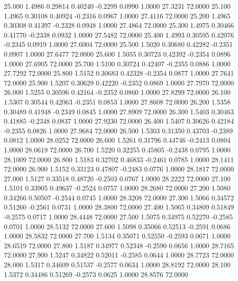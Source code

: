   25.000   1.4986   0.29814   0.40240  -0.2299   0.0990   1.0000  27.3231  72.0000
  25.100   1.4965   0.30108   0.40924  -0.2316   0.0967   1.0000  27.4116  72.0000
  25.200   1.4965   0.30308   0.41397  -0.2328   0.0948   1.0000  27.4864  72.0000
  25.300   1.4975   0.30466   0.41770  -0.2338   0.0932   1.0000  27.5482  72.0000
  25.400   1.4993   0.30595   0.42076  -0.2345   0.0919   1.0000  27.6004  72.0000
  25.500   1.5020   0.30680   0.42282  -0.2351   0.0907   1.0000  27.6477  72.0000
  25.600   1.5055   0.30723   0.42392  -0.2354   0.0896   1.0000  27.6905  72.0000
  25.700   1.5100   0.30724   0.42407  -0.2355   0.0886   1.0000  27.7292  72.0000
  25.800   1.5152   0.30683   0.42328  -0.2354   0.0877   1.0000  27.7641  72.0000
  25.900   1.5207   0.30629   0.42220  -0.2352   0.0869   1.0000  27.7970  72.0000
  26.000   1.5255   0.30596   0.42164  -0.2352   0.0860   1.0000  27.8299  72.0000
  26.100   1.5307   0.30544   0.42063  -0.2351   0.0853   1.0000  27.8608  72.0000
  26.200   1.5358   0.30489   0.41948  -0.2349   0.0845   1.0000  27.8909  72.0000
  26.300   1.5403   0.30463   0.41885  -0.2348   0.0837   1.0000  27.9230  72.0000
  26.400   1.5407   0.30626   0.42184  -0.2355   0.0826   1.0000  27.9684  72.0000
  26.500   1.5303   0.31350   0.43703  -0.2389   0.0812   1.0000  28.0252  72.0000
  26.600   1.5261   0.31796   0.44746  -0.2413   0.0804   1.0000  28.0619  72.0000
  26.700   1.5220   0.32255   0.45805  -0.2438   0.0795   1.0000  28.1009  72.0000
  26.800   1.5183   0.32702   0.46833  -0.2461   0.0785   1.0000  28.1411  72.0000
  26.900   1.5152   0.33123   0.47807  -0.2483   0.0776   1.0000  28.1817  72.0000
  27.000   1.5127   0.33518   0.48720  -0.2503   0.0767   1.0000  28.2222  72.0000
  27.100   1.5101   0.33905   0.49637  -0.2524   0.0757   1.0000  28.2680  72.0000
  27.200   1.5080   0.34266   0.50507  -0.2544   0.0745   1.0000  28.3208  72.0000
  27.300   1.5066   0.34572   0.51260  -0.2561   0.0731   1.0000  28.3800  72.0000
  27.400   1.5065   0.34809   0.51849  -0.2575   0.0717   1.0000  28.4448  72.0000
  27.500   1.5075   0.34975   0.52270  -0.2585   0.0701   1.0000  28.5132  72.0000
  27.600   1.5098   0.35066   0.52513  -0.2591   0.0686   1.0000  28.5832  72.0000
  27.700   1.5134   0.35071   0.52550  -0.2593   0.0671   1.0000  28.6519  72.0000
  27.800   1.5187   0.34977   0.52348  -0.2590   0.0656   1.0000  28.7165  72.0000
  27.900   1.5247   0.34822   0.52011  -0.2585   0.0644   1.0000  28.7723  72.0000
  28.000   1.5317   0.34609   0.51537  -0.2577   0.0634   1.0000  28.8192  72.0000
  28.100   1.5372   0.34486   0.51269  -0.2573   0.0625   1.0000  28.8576  72.0000
